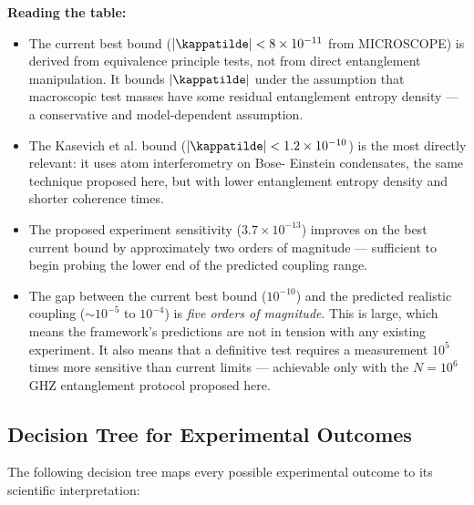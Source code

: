 \noindent\textbf{Reading the table:}
\begin{itemize}
    \item The current best bound ($|\kappatilde| < 8\times10^{-11}$ from
    MICROSCOPE) is derived from equivalence principle tests, not from
    direct entanglement manipulation. It bounds $|\kappatilde|$ under
    the assumption that macroscopic test masses have some residual
    entanglement entropy density --- a conservative and model-dependent
    assumption.

    \item The Kasevich et al. bound ($|\kappatilde| < 1.2\times10^{-10}$)
    is the most directly relevant: it uses atom interferometry on Bose-
    Einstein condensates, the same technique proposed here, but with
    lower entanglement entropy density and shorter coherence times.

    \item The proposed experiment sensitivity ($3.7\times10^{-13}$)
    improves on the best current bound by approximately two orders of
    magnitude --- sufficient to begin probing the lower end of the
    predicted coupling range.

    \item The gap between the current best bound ($10^{-10}$) and the
    predicted realistic coupling ($\sim10^{-5}$ to $10^{-4}$) is
    \emph{five orders of magnitude}. This is large, which means the
    framework's predictions are not in tension with any existing
    experiment. It also means that a definitive test requires a
    measurement $10^5$ times more sensitive than current limits ---
    achievable only with the $N = 10^6$ GHZ entanglement protocol
    proposed here.
\end{itemize}

\subsection{Decision Tree for Experimental Outcomes}
\label{subsec:decision_tree}

The following decision tree maps every possible experimental outcome to
its scientific interpretation:

